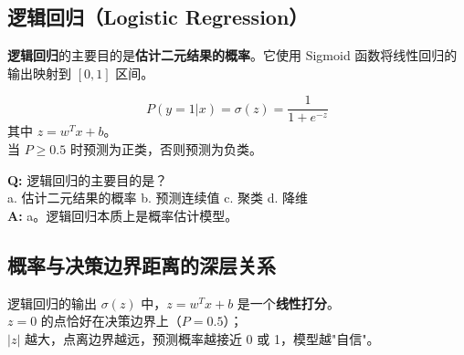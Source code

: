 \documentclass[11pt,a4paper]{article}
\begin{document}
\subsection{逻辑回归（Logistic Regression）}

\begin{bluebox}[逻辑回归的核心目的]
\textbf{逻辑回归}的主要目的是\textbf{估计二元结果的概率}。它使用 Sigmoid 函数将线性回归的输出映射到 $[0, 1]$ 区间。
\end{bluebox}

\begin{orangebox}
$$P(y=1|x) = \sigma(z) = \frac{1}{1 + e^{-z}}$$
其中 $z = w^T x + b$。\\
当 $P \geq 0.5$ 时预测为正类，否则预测为负类。
\end{orangebox}

\begin{examplebox}[例题：逻辑回归的目的]
\textbf{Q:} 逻辑回归的主要目的是？\\
a. 估计二元结果的概率 \quad b. 预测连续值 \quad c. 聚类 \quad d. 降维\\
\textbf{A:} a。逻辑回归本质上是概率估计模型。
\end{examplebox}

\subsection{概率与决策边界距离的深层关系}

\begin{bluebox}
逻辑回归的输出 $\sigma(z)$ 中，$z = w^T x + b$ 是一个\textbf{线性打分}。\\
$z = 0$ 的点恰好在决策边界上（$P=0.5$）；\\
$|z|$ 越大，点离边界越远，预测概率越接近 0 或 1，模型越"自信"。
\end{bluebox}
\end{document}
